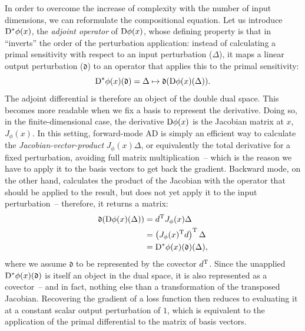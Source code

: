 In order to overcome the increase of complexity with the number of input dimensions, we can
reformulate the compositional equation.  Let us introduce \(\mathop{}\!\mathrm{D}^{*} \phi(x)\), the \emph{adjoint
  operator} of \(\mathop{}\!\mathrm{D} \phi(x)\), whose defining property is that in \enquote{inverts} the order of
the perturbation application: instead of calculating a primal sensitivity with respect to an input
perturbation (\(\Delta\)), it maps a linear output perturbation (\(\mathfrak{d}\)) to an operator
that applies this to the primal sensitivity:
\begin{equation}
  \mathop{}\!\mathrm{D}^{*} \phi(x)(\mathfrak{d}) = \Delta \mapsto \mathfrak{d}(\mathop{}\!\mathrm{D} \phi(x)(\Delta)).
\end{equation}
The adjoint differential is therefore an object of the double dual space.  This becomes more
readable when we fix a basis to represent the derivative.  Doing so, in the finite-dimensional case,
the derivative \(\mathop{}\!\mathrm{D} \phi(x)\) is the Jacobian matrix at \(x\), \(J_{\phi}(x)\).  In this setting,
forward-mode AD is simply an efficient way to calculate the \emph{Jacobian-vector-product}
\(J_{\phi}(x) \Delta\), or equivalently the total derivative for a fixed perturbation, avoiding full
matrix multiplication~-- which is the reason we have to apply it to the basis vectors to get back
the gradient.  Backward mode, on the other hand, calculates the product of the Jacobian with the
operator that should be applied to the result, but does not yet apply it to the input
perturbation~-- therefore, it returns a matrix:
\begin{equation}
  \begin{aligned}
    \mathfrak{d} (\mathop{}\!\mathrm{D} \phi(x)(\Delta)) &= d^{\mathrm{T}} J_{\phi}(x) \Delta \\
    &= \left( J_{\phi}(x)^{\mathrm{T}} d \right)^{\mathrm{T}} \Delta \\
    &= \mathop{}\!\mathrm{D}^{*} \phi(x)(\mathfrak{d})(\Delta),
  \end{aligned}
\end{equation}
where we assume \(\mathfrak{d}\) to be represented by the covector \(d^{\mathrm{T}}\).  Since the
unapplied \(\mathop{}\!\mathrm{D}^{*} \phi(x)(\mathfrak{d})\) is itself an object in the dual space, it is also
represented as a covector~-- and in fact, nothing else than a transformation of the transposed
Jacobian.  Recovering the gradient of a loss function then reduces to evaluating it at a constant
scalar output perturbation of \(1\), which is equivalent to the application of the primal
differential to the matrix of basis vectors.

